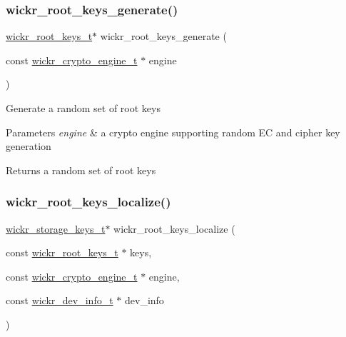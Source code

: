 \subsubsection{\texorpdfstring{wickr\_root\_keys\_generate()}{wickr\_root\_keys\_generate()}}
{\footnotesize\ttfamily \mbox{\hyperlink{structwickr__root__keys}{wickr\+\_\+root\+\_\+keys\+\_\+t}}$\ast$ wickr\+\_\+root\+\_\+keys\+\_\+generate (\begin{DoxyParamCaption}\item[{const \mbox{\hyperlink{structwickr__crypto__engine}{wickr\+\_\+crypto\+\_\+engine\+\_\+t}} $\ast$}]{engine }\end{DoxyParamCaption})}

Generate a random set of root keys


\begin{DoxyParams}{Parameters}
{\em engine} & a crypto engine supporting random EC and cipher key generation \\
\hline
\end{DoxyParams}
\begin{DoxyReturn}{Returns}
a random set of root keys 
\end{DoxyReturn}
\mbox{\label{group__wickr__root__keys_gaa34dd6c85c667b8b7fb025f56c7bcc46}} 
\subsubsection{\texorpdfstring{wickr\_root\_keys\_localize()}{wickr\_root\_keys\_localize()}}
{\footnotesize\ttfamily \mbox{\hyperlink{structwickr__storage__keys}{wickr\+\_\+storage\+\_\+keys\+\_\+t}}$\ast$ wickr\+\_\+root\+\_\+keys\+\_\+localize (\begin{DoxyParamCaption}\item[{const \mbox{\hyperlink{structwickr__root__keys}{wickr\+\_\+root\+\_\+keys\+\_\+t}} $\ast$}]{keys,  }\item[{const \mbox{\hyperlink{structwickr__crypto__engine}{wickr\+\_\+crypto\+\_\+engine\+\_\+t}} $\ast$}]{engine,  }\item[{const \mbox{\hyperlink{structwickr__dev__info}{wickr\+\_\+dev\+\_\+info\+\_\+t}} $\ast$}]{dev\+\_\+info }\end{DoxyParamCaption})}

